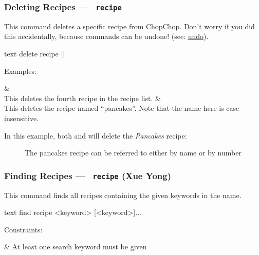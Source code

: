 








\hypertarget{DeleteRecipeCommand}{}
\subsubsection{Deleting Recipes — \texttt{ recipe}}

	This command deletes a specific recipe from ChopChop. Don't worry if you did this accidentally, because commands can be undone!
	(see: \hyperlink{UndoCommand}{undo}).

	 \begin{blockofcode}{text}
		delete recipe |\itemref{}|
	\end{blockofcode}

	Examples:
	\begin{bulletlist}
		&  \\
			This deletes the fourth recipe in the recipe list.
		&  \\
			This deletes the recipe named \enquote{pancakes}. Note that the name here is case insensitive.
	\end{bulletlist}

	In this example, both  and  will delete the \emph{Pancakes} recipe:


	\begin{figure}[!htbp]\centering
		\caption{The pancakes recipe can be referred to either by name or by number}
	\end{figure}



\pagebreak
\hypertarget{FindRecipeCommand}{}
\subsubsection{Finding Recipes — \texttt{ recipe} (Xue Yong)}

	This command finds all recipes containing the given keywords in the name.

	 \begin{blockofcode}{text}
		find recipe
			<keyword>
			[<keyword>]...
	\end{blockofcode}

	Constraints:
	\begin{romanlist}
		& At least one search keyword must be given
	\end{romanlist}

